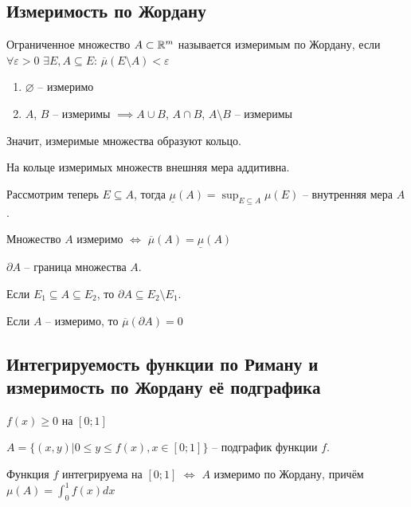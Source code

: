 \subsection{Измеримость по Жордану}

\begin{definition}
    Ограниченное множество $A \subset \mathbb{R}^m$ называется измеримым по Жордану, если $\forall \varepsilon > 0$ $\exists E, A \subseteq E$: $\overline{\mu}(E \setminus A) < \varepsilon$
\end{definition}

\begin{enumerate}
    \item $\varnothing$ -- измеримо
    \item $A$, $B$ -- измеримы $\implies A \cup B$, $A \cap B$, $A \setminus B$ -- измеримы
\end{enumerate}

Значит, измеримые множества образуют кольцо.

На кольце измеримых множеств внешняя мера аддитивна.

\begin{definition}
    Рассмотрим теперь $E \subseteq A$, тогда $\underline{\mu}(A) = \sup_{E \subseteq A} \mu(E)$ -- внутренняя мера $A$.
\end{definition}

Множество $A$ измеримо $\iff$ $\overline{\mu}(A) = \underline{\mu}(A)$

$\partial A$ -- граница множества $A$.

Если $E_1 \subseteq A \subseteq E_2$, то $\partial A \subseteq E_2 \setminus E_1$.

Если $A$ -- измеримо, то $\overline{\mu}(\partial A) = 0$

\subsection{Интегрируемость функции по Риману и измеримость по Жордану её подграфика}

$f(x) \geq 0$ на $[0; 1]$

$A = \{(x, y) | 0 \leq y \leq f(x), x \in [0; 1]\}$ -- подграфик функции $f$.

Функция $f$ интегрируема на $[0; 1]$ $\iff$ $A$ измеримо по Жордану, причём $\mu(A) = \int_{0}^{1} f(x) dx$